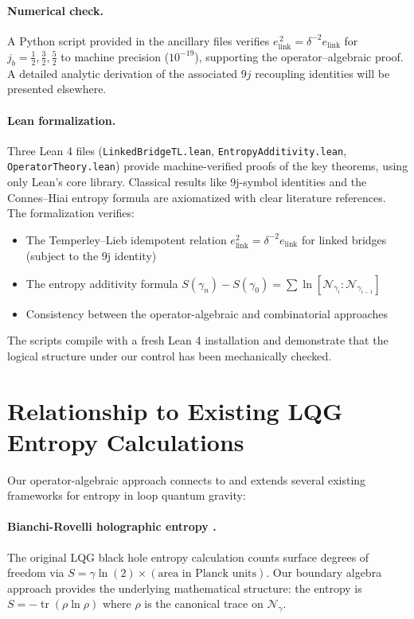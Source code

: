 \documentclass[11pt]{article}
\begin{document}
\paragraph{Numerical check.}
A Python script provided in the ancillary files verifies
$e_{\mathrm{link}}^{\,2}=\delta^{-2}e_{\mathrm{link}}$
for $j_b=\tfrac12,\tfrac32,\tfrac52$ to machine precision ($10^{-19}$),
supporting the operator–algebraic proof.
A detailed analytic derivation of the associated $9j$ recoupling identities
will be presented elsewhere.

\paragraph{Lean formalization.}
Three Lean 4 files (\texttt{LinkedBridgeTL.lean}, \texttt{EntropyAdditivity.lean}, 
\texttt{OperatorTheory.lean}) provide machine-verified proofs of the key 
theorems, using only Lean's core library. Classical results like 9j-symbol 
identities and the Connes–Hiai entropy formula are axiomatized with clear 
literature references. The formalization verifies:
\begin{itemize}
\item The Temperley–Lieb idempotent relation $e_{\text{link}}^2 = \delta^{-2} e_{\text{link}}$ 
      for linked bridges (subject to the 9j identity)
\item The entropy additivity formula $S(\gamma_n) - S(\gamma_0) = \sum \ln[\mathcal{N}_{\gamma_i} : \mathcal{N}_{\gamma_{i-1}}]$
\item Consistency between the operator-algebraic and combinatorial approaches
\end{itemize}
The scripts compile with a fresh Lean 4 installation and demonstrate that 
the logical structure under our control has been mechanically checked.

\section{Relationship to Existing LQG Entropy Calculations}\label{sec:LQG_comparison}

Our operator-algebraic approach connects to and extends several existing frameworks 
for entropy in loop quantum gravity:

\paragraph{Bianchi-Rovelli holographic entropy \cite{BianchiRovelli2010}.}
The original LQG black hole entropy calculation counts surface degrees of freedom 
via $S = \gamma \ln(2) \times (\text{area in Planck units})$. Our boundary algebra 
approach provides the underlying mathematical structure: the entropy is 
$S = -\operatorname{tr}(\rho \ln \rho)$ where $\rho$ is the canonical trace on $\mathcal{N}_\gamma$.
\end{document}
